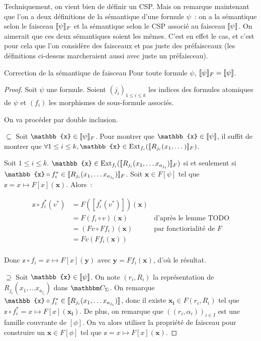 Techniquement, on vient bien de définir un CSP. Mais on remarque maintenant que l'on a
deux définitions de la sémantique d'une formule $\psi$~: on a la sémantique selon le
faisceau $\llbracket {\psi} \rrbracket_F$ et la sémantique selon le CSP associé au faisceau $\llbracket {\psi} \rrbracket$.
On aimerait que ces deux sémantiques soient les mêmes. C'est en effet le cas, et c'est pour
cela que l'on considère des faisceaux et pas juste des préfaisceaux (les définitions
ci-dessus marcheraient aussi avec juste un préfaisceau).

\begin{theo}{Correction de la sémantique de faisceau}
    Pour toute formule $\psi$, $\llbracket {\psi} \rrbracket_F = \llbracket {\psi} \rrbracket$.
\end{theo}

\begin{proof}
    Soit $\psi$ une formule.
    Soient $(j_i)_{1\leq i\leq k}$ les indices des formules atomiques de $\psi$
    et $(f_i)$ les morphismes de sous-formule associés.

    On va procéder par double inclusion.

    $\boxed{\subseteq}$ Soit $\mathbb{x}\in\sem{\psi}_F$.  Pour montrer que
    $\mathbb{x}\in\sem{\psi}$, il suffit de montrer que $\forall 1\leq i\leq k,
    \mathbb{x}\in\ext_{f_i}(\sem{R_{j_i}(x_1,\dots)}_F)$.

    Soit $1\leq i\leq k$. $\mathbb{x}\in\ext_{f_i}(\sem{R_{j_i}(x_1,\dots
    x_{a_{j_i}})}_F)$ si et seulement si $\mathbb{x}\circ f_i^*\in\sem{R_{j_i}(x_1,\dots
    x_{a_{j_i}})}_F$. Soit $\mathbf{x}\in F[\psi]$ tel que
    $\mathbb{x} = x\mapsto F[x](\mathbf{x})$.
    Alors~:
    
    \[\begin{array}{rll}
        \mathbb{x}\circ f_i^*(v^*) &= F([f_i^*(v^*)])(\mathbf{x}) & \\
         &= F(f_i\circ v)(\mathbf{x})
             & \text{d'après le lemme TODO} \\
         &= (Fv\circ Ff_i)(\mathbf{x}) & \text{par fonctiorialité de } F\\
         &= Fv(Ff_i(\mathbf{x})) & \\
    \end{array}\]

    Donc $\mathbb{x}\circ f_i = x\mapsto F[x](\mathbf{y})$ 
    avec $\mathbf{y} = Ff_i(\mathbf{x})$, d'où le résultat.

    $\boxed{\supseteq}$ Soit $\mathbb{x}\in\sem{\psi}$. On note $(r_i,R_i)$ la
    représentation de $R_{j_i}(x_1,\dots x_{a_{j_i}})$ dans $\C_\Sigma$. On
    remarque $\mathbb{x}\circ f_i^*\in\sem{R_{j_i}(x_1,\dots x_{a_{j_i}})}$, donc il existe
    $\mathbf{x_i}\in F(r_i,R_i)$ tel que
    $\mathbb{x}\circ f_i^* = x\mapsto F[x](\mathbf{x_i})$. De plus, on remarque que
    $((r_i,\alpha_i))_{i\in I}$ est une famille couvrante de $[\phi]$. On va alors utiliser
    la propriété de faisceau pour construire un $\mathbf{x}\in F[\phi]$ tel que
    $\mathbb{x} = x\mapsto F[x](\mathbf{x})$.


\end{proof}
